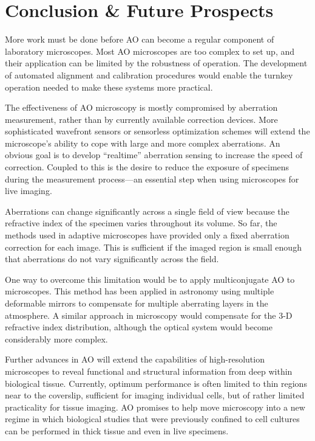 \section{Conclusion \& Future Prospects}
\label{sec:Future}

More work must be done before AO can become a regular component of laboratory 
microscopes. Most AO microscopes are too complex to set up, and their 
application can be limited by the robustness of operation. The development of 
automated alignment and calibration procedures would enable the turnkey 
operation needed to make these systems more practical.

The effectiveness of AO microscopy is mostly compromised by aberration 
measurement, rather than by currently available correction devices. More 
sophisticated wavefront sensors or sensorless optimization schemes will 
extend the microscope’s ability to cope with large and more complex 
aberrations. An obvious goal is to develop “realtime” aberration sensing to 
increase the speed of correction. Coupled to this is the desire to reduce the 
exposure of specimens during the measurement process—an essential step when 
using microscopes for live imaging.

Aberrations can change significantly across a single field of view because 
the refractive index of the specimen varies throughout its volume. So far, 
the methods used in adaptive microscopes have provided only a fixed 
aberration correction for each image. This is sufficient if the imaged region 
is small enough that aberrations do not vary significantly across the field.

One way to overcome this limitation would be to apply multiconjugate AO to 
microscopes. This method has been applied in astronomy using multiple 
deformable mirrors to compensate for multiple aberrating layers in the 
atmosphere. A similar approach in microscopy would compensate for the 3-D 
refractive index distribution, although the optical system would become 
considerably more complex.

Further advances in AO will extend the capabilities of high-resolution 
microscopes to reveal functional and structural information from deep within 
biological tissue. Currently, optimum performance is often limited to thin 
regions near to the coverslip, sufficient for imaging individual cells, but 
of rather limited practicality for tissue imaging. AO promises to help move 
microscopy into a new regime in which biological studies that were previously 
confined to cell cultures can be performed in thick tissue and even in live 
specimens.


